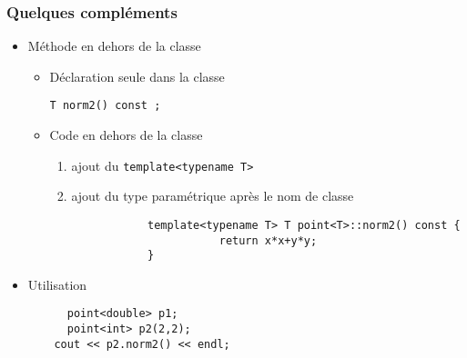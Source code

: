 \begin{frame}[fragile]\frametitle{Quelques compléments}
\begin{itemize}
	\item Méthode en dehors de la classe
	\begin{itemize}
		\item Déclaration seule dans la classe
\begin{lstlisting}
T norm2() const ;
\end{lstlisting}
		\item Code en dehors de la classe
		\begin{enumerate}
			\item ajout du \texttt{template<typename T>}
			\item ajout du type paramétrique après le nom de classe
		\end{enumerate}
		\begin{lstlisting}
		       template<typename T> T point<T>::norm2() const {
		                  return x*x+y*y;
		       }
		\end{lstlisting}
	\end{itemize}
	\item Utilisation
	\begin{lstlisting}
	  point<double> p1;
	  point<int> p2(2,2);
    cout << p2.norm2() << endl;
	\end{lstlisting}
\end{itemize}
\end{frame}
